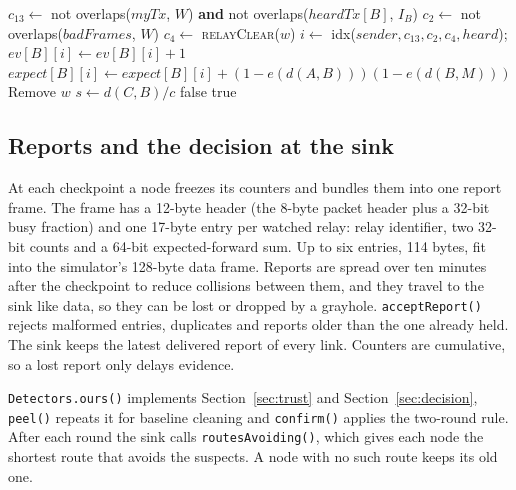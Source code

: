 \documentclass{article}
\begin{document}
\begin{algorithm}[htbp]
\small
\caption{\texttt{closeWindows()} and \texttt{relayClear()} in \texttt{MonitorNode}}\label{alg:close}
\begin{algorithmic}[1]
    \State $c_{13} \gets$ not overlaps($\mathit{myTx}$, $W$) \textbf{and} not overlaps($\mathit{heardTx}[B]$, $I_B$)
    \State $c_2 \gets$ not overlaps($\mathit{badFrames}$, $W$) 
    \State $c_4 \gets$ \textsc{relayClear}($w$)
    \State $i \gets$ idx($\mathit{sender}, c_{13}, c_2, c_4, \mathit{heard}$); \; $\mathit{ev}[B][i] \gets \mathit{ev}[B][i] + 1$
    \State $\mathit{expect}[B][i] \gets \mathit{expect}[B][i] + (1-e(d(A,B)))(1-e(d(B,M)))$
    \State Remove $w$
  \EndFor
\EndFunction
{}
    \State $s \gets d(C,B)/c$
     \State \Return false \EndIf
  \EndFor
  \State \Return true
\EndFunction
\end{algorithmic}
\end{algorithm}

\subsection{Reports and the decision at the sink}
\noindent
At each checkpoint a node freezes its counters and bundles them into one report frame. The frame has a 12-byte header (the 8-byte packet header plus a 32-bit busy fraction) and one 17-byte entry per watched relay: relay identifier, two 32-bit counts and a 64-bit expected-forward sum. Up to six entries, 114 bytes, fit into the simulator's 128-byte data frame. Reports are spread over ten minutes after the checkpoint to reduce collisions between them, and they travel to the sink like data, so they can be lost or dropped by a grayhole. \texttt{acceptReport()} rejects malformed entries, duplicates and reports older than the one already held. The sink keeps the latest delivered report of every link. Counters are cumulative, so a lost report only delays evidence.

\texttt{Detectors.ours()} implements Section~\ref{sec:trust} and Section~\ref{sec:decision}, \texttt{peel()} repeats it for baseline cleaning and \texttt{confirm()} applies the two-round rule. After each round the sink calls \texttt{routesAvoiding()}, which gives each node the shortest route that avoids the suspects. A node with no such route keeps its old one.
\end{document}
